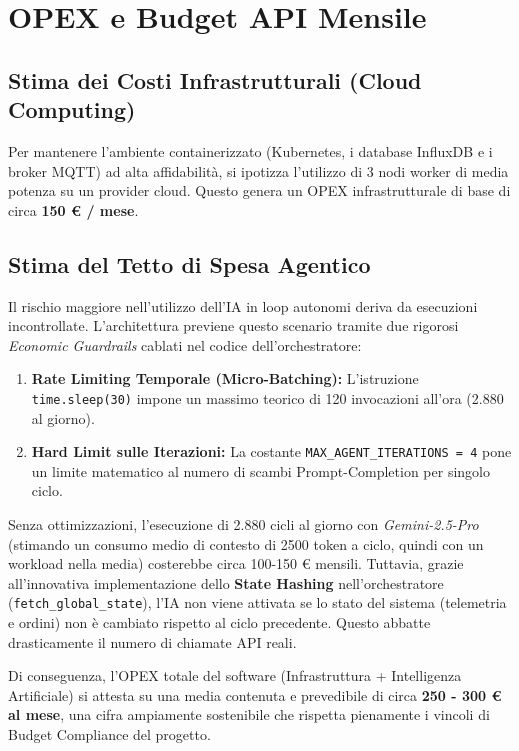 \section{OPEX e Budget API Mensile}
\label{sec:opex_budget}

\subsection*{Stima dei Costi Infrastrutturali (Cloud Computing)}
Per mantenere l'ambiente containerizzato (Kubernetes, i database InfluxDB e i broker MQTT) ad alta affidabilità, si ipotizza l'utilizzo di 3 nodi worker di media potenza su un provider cloud. Questo genera un OPEX infrastrutturale di base di circa \textbf{150 € / mese}.

\subsection*{Stima del Tetto di Spesa Agentico}
Il rischio maggiore nell'utilizzo dell'IA in loop autonomi deriva da esecuzioni incontrollate. L'architettura previene questo scenario tramite due rigorosi \textit{Economic Guardrails} cablati nel codice dell'orchestratore:
\begin{enumerate}
    \item \textbf{Rate Limiting Temporale (Micro-Batching):} L'istruzione \texttt{time.sleep(30)} impone un massimo teorico di 120 invocazioni all'ora (2.880 al giorno).
    \item \textbf{Hard Limit sulle Iterazioni:} La costante \texttt{MAX\_AGENT\_ITERATIONS = 4} pone un limite matematico al numero di scambi Prompt-Completion per singolo ciclo.
\end{enumerate}

Senza ottimizzazioni, l'esecuzione di 2.880 cicli al giorno con \textit{Gemini-2.5-Pro} (stimando un consumo medio di contesto di 2500 token a ciclo, quindi con un workload nella media) costerebbe circa 100-150 € mensili. Tuttavia, grazie all'innovativa implementazione dello \textbf{State Hashing} nell'orchestratore (\texttt{fetch\_global\_state}), l'IA non viene attivata se lo stato del sistema (telemetria e ordini) non è cambiato rispetto al ciclo precedente. Questo abbatte drasticamente il numero di chiamate API reali.

Di conseguenza, l'OPEX totale del software (Infrastruttura + Intelligenza Artificiale) si attesta su una media contenuta e prevedibile di circa \textbf{250 - 300 € al mese}, una cifra ampiamente sostenibile che rispetta pienamente i vincoli di Budget Compliance del progetto.

